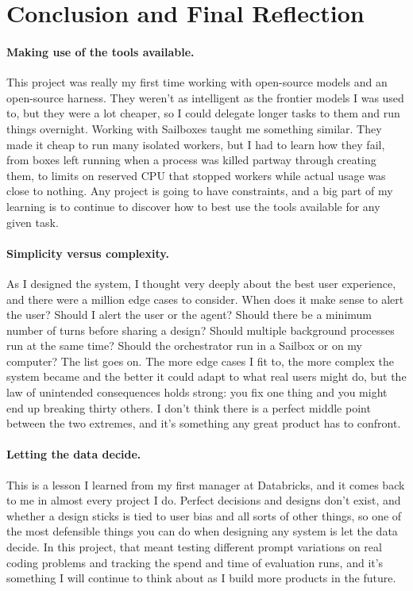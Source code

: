 \section{Conclusion and Final Reflection}
\label{sec:conclusion}

\paragraph{Making use of the tools available.}
This project was really my first time working with open-source models and an open-source harness. They weren't as intelligent as the frontier models I was used to, but they were a lot cheaper, so I could delegate longer tasks to them and run things overnight. Working with Sailboxes taught me something similar. They made it cheap to run many isolated workers, but I had to learn how they fail, from boxes left running when a process was killed partway through creating them, to limits on reserved CPU that stopped workers while actual usage was close to nothing. Any project is going to have constraints, and a big part of my learning is to continue to discover how to best use the tools available for any given task.

\paragraph{Simplicity versus complexity.}
As I designed the system, I thought very deeply about the best user experience, and there were a million edge cases to consider. When does it make sense to alert the user? Should I alert the user or the agent? Should there be a minimum number of turns before sharing a design? Should multiple background processes run at the same time? Should the orchestrator run in a Sailbox or on my computer? The list goes on. The more edge cases I fit to, the more complex the system became and the better it could adapt to what real users might do, but the law of unintended consequences holds strong: you fix one thing and you might end up breaking thirty others. I don't think there is a perfect middle point between the two extremes, and it's something any great product has to confront.

\paragraph{Letting the data decide.}
This is a lesson I learned from my first manager at Databricks, and it comes back to me in almost every project I do. Perfect decisions and designs don't exist, and whether a design sticks is tied to user bias and all sorts of other things, so one of the most defensible things you can do when designing any system is let the data decide. In this project, that meant testing different prompt variations on real coding problems and tracking the spend and time of evaluation runs, and it's something I will continue to think about as I build more products in the future.
